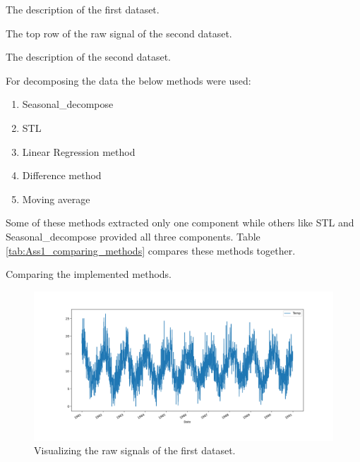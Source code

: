 \documentclass[12pt]{article}
\begin{document}
\begin{enumerate}
\begin{table}[]
 \centering
\caption{The description of the first dataset.
{\label{tab:Ass1_D1_raw_signal_summary_statistics}}}

\end{table}

\begin{table}[]
 \centering
\caption{The top row of the raw signal of the second dataset.
{\label{tab:Ass1_D2_raw_signal}}}

\end{table}

\begin{table}[]
 \centering
\caption{The description of the second dataset.
{\label{tab:Ass1_D2_raw_signal_summary_statistics}}}

\end{table}

For decomposing the data the below methods were used:
    \begin{enumerate}
    \item Seasonal\_decompose
    \item STL
    \item Linear Regression method
    \item Difference method
    \item Moving average
    \end{enumerate}
Some of these methods extracted only one component while others like STL and Seasonal\_decompose provided all three components. Table \ref{tab:Ass1_comparing_methods} compares these methods together.

\begin{table}[H]
\centering
\caption{Comparing the implemented methods.
{\label{tab:Ass1_comparing_methods}}}

\end{table}


\begin{figure}[]
    \centering
    \begin{minipage}[b]{1\textwidth}
        \includegraphics[width=\textwidth]{figures/Ass1/Ass1_D1_raw_signal.png}
    \end{minipage}
    \caption{Visualizing the raw signals of the first dataset.}
    \label{fig:Ass1_D1_raw_signal}
\end{figure}


\end{enumerate}
\end{document}
